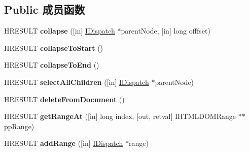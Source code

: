 \subsection*{Public 成员函数}
\begin{DoxyCompactItemize}
\item 
\mbox{\label{interface_m_s_h_t_m_l_1_1_i_h_t_m_l_selection_a18e6e41a2447127e3e29d8a39e12b27a}} 
H\+R\+E\+S\+U\+LT {\bfseries collapse} (\mbox{[}in\mbox{]} \hyperlink{interface_i_dispatch}{I\+Dispatch} $\ast$parent\+Node, \mbox{[}in\mbox{]} long offfset)
\item 
\mbox{\label{interface_m_s_h_t_m_l_1_1_i_h_t_m_l_selection_ad87afb15babd1ecc0b1dda56e1459468}} 
H\+R\+E\+S\+U\+LT {\bfseries collapse\+To\+Start} ()
\item 
\mbox{\label{interface_m_s_h_t_m_l_1_1_i_h_t_m_l_selection_a16f6a9d545acca332de966b917a06507}} 
H\+R\+E\+S\+U\+LT {\bfseries collapse\+To\+End} ()
\item 
\mbox{\label{interface_m_s_h_t_m_l_1_1_i_h_t_m_l_selection_a00eab2873ab683d5d0c488b623eab13c}} 
H\+R\+E\+S\+U\+LT {\bfseries select\+All\+Children} (\mbox{[}in\mbox{]} \hyperlink{interface_i_dispatch}{I\+Dispatch} $\ast$parent\+Node)
\item 
\mbox{\label{interface_m_s_h_t_m_l_1_1_i_h_t_m_l_selection_ad55a8e1c36c2e4ce503857aaa49f223d}} 
H\+R\+E\+S\+U\+LT {\bfseries delete\+From\+Document} ()
\item 
\mbox{\label{interface_m_s_h_t_m_l_1_1_i_h_t_m_l_selection_a92591f5983c90d42394b5ae37e93967e}} 
H\+R\+E\+S\+U\+LT {\bfseries get\+Range\+At} (\mbox{[}in\mbox{]} long index, \mbox{[}out, retval\mbox{]} I\+H\+T\+M\+L\+D\+O\+M\+Range $\ast$$\ast$pp\+Range)
\item 
\mbox{\label{interface_m_s_h_t_m_l_1_1_i_h_t_m_l_selection_a1769538f638d90d6247d4674f2f11f05}} 
H\+R\+E\+S\+U\+LT {\bfseries add\+Range} (\mbox{[}in\mbox{]} \hyperlink{interface_i_dispatch}{I\+Dispatch} $\ast$range)
$$
\end{DoxyCompactItemize}
